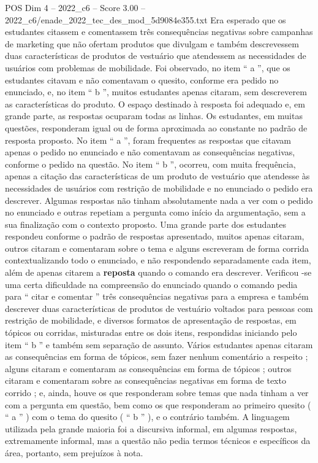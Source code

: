 \begin{textsample}{POS Dim 4 – 2022\_c6 – Score 3.00 – 2022\_c6/enade\_2022\_tec\_des\_mod\_5d9084e355.txt}
Era esperado que os estudantes citassem e comentassem três consequências negativas sobre campanhas de marketing que não ofertam produtos que divulgam e também descrevessem duas características de produtos de vestuário que atendessem as necessidades de usuários com problemas de mobilidade.
Foi observado, no item “ a ”, que os estudantes citavam e não comentavam o quesito, conforme era pedido no enunciado, e, no item “ b ”, muitos estudantes apenas citaram, sem descreverem as características do produto.
O espaço destinado à resposta foi adequado e, em grande parte, as respostas ocuparam todas as linhas.
Os estudantes, em muitas questões, responderam igual ou de forma aproximada ao constante no padrão de resposta proposto.
No item “ a ”, foram frequentes as respostas que citavam apenas o pedido no enunciado e não comentavam as consequências negativas, conforme o pedido na questão.
No item “ b ”, ocorreu, com muita frequência, apenas a citação das características de um produto de vestuário que atendesse às necessidades de usuários com restrição de mobilidade e no enunciado o pedido era descrever.
Algumas respostas não tinham absolutamente nada a ver com o pedido no enunciado e outras repetiam a pergunta como início da argumentação, sem a sua finalização com o contexto proposto.
Uma grande parte dos estudantes respondeu conforme o padrão de respostas apresentado, muitos apenas citaram, outros citaram e comentaram sobre o tema e alguns escreveram de forma corrida contextualizando todo o enunciado, e não respondendo separadamente cada item, além de apenas citarem a \textbf{reposta} quando o comando era descrever.
Verificou -se uma certa dificuldade na compreensão do enunciado quando o comando pedia para “ citar e comentar ” três consequências negativas para a empresa e também descrever duas características de produtos de vestuário voltados para pessoas com restrição de mobilidade, e diversos formatos de apresentação de respostas, em tópicos ou corridas, misturadas entre os dois itens, respondidas iniciando pelo item “ b ” e também sem separação de assunto.
Vários estudantes apenas citaram as consequências em forma de tópicos, sem fazer nenhum comentário a respeito ; alguns citaram e comentaram as consequências em forma de tópicos ; outros citaram e comentaram sobre as consequências negativas em forma de texto corrido ; e, ainda, houve os que responderam sobre temas que nada tinham a ver com a pergunta em questão, bem como os que responderam ao primeiro quesito ( “ a ” ) com o tema do quesito ( “ b ” ), e o contrário também.
A linguagem utilizada pela grande maioria foi a discursiva informal, em algumas respostas, extremamente informal, mas a questão não pedia termos técnicos e específicos da área, portanto, sem prejuízos à nota.

\end{textsample}
